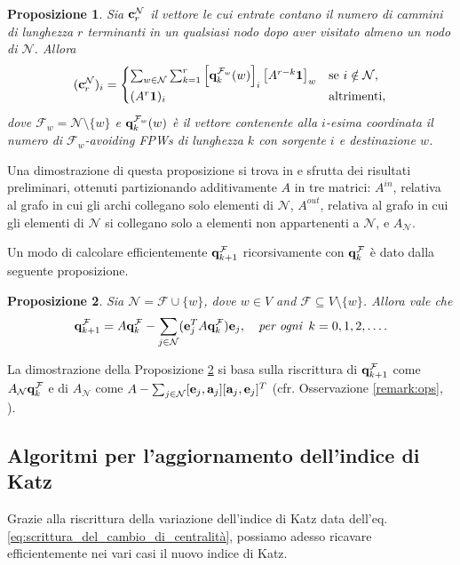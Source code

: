 \documentclass[a4paper]{article}
\newcommand{\evec}{{\bf e}}
\newcommand{\cvec}{{\bf c}}
\newcommand{\avec}{{\bf a}}
\newcommand{\qvec}{{\bf q}}
\newcommand{\bone}{\mathbf{1}}
\newcommand{\cN}{\mathcal{N}}
\newcommand{\cF}{\mathcal{F}}
\newcommand{\se}{\text{se }}
\newcommand{\altrimenti}{\text{altrimenti}}
\newtheorem{proposition}{Proposizione}
\begin{document}
	\begin{proposition} \label{prop:qkfi}
		Sia $\cvec_r^\cN$ il vettore le cui entrate contano il numero di
		cammini di lunghezza $r$ terminanti in un qualsiasi nodo dopo aver
		visitato almeno un nodo di $\cN$. Allora
		\[
			(\cvec_r^\cN)_i = \begin{cases}
			\sum_{w \in \cN} \sum_{k=1}^r \left[\qvec_k^{\cF_w}(w) \right]_i \left[A^{r-k} \bone\right]_w & \se i \notin \cN, \\
			(A^r \bone)_i & \altrimenti,
			\end{cases}
		\]
		dove $\cF_w = \cN \setminus \{ w \}$ e $\qvec_k^{\cF_w}(w)$ è
		il vettore contenente alla $i$-esima coordinata il numero di
		$\cF_w$-avoiding FPWs di lunghezza $k$ con sorgente $i$ e destinazione
		$w$.
	\end{proposition}
	
	Una dimostrazione di questa proposizione si trova in \cite[Proposition 4]{katz2024} e sfrutta dei risultati preliminari, ottenuti partizionando
	additivamente $A$ in tre matrici: $A^{in}$, relativa al grafo in cui gli
	archi collegano solo elementi di $\cN$, $A^{out}$, relativa al grafo in cui
	gli elementi di $\cN$ si collegano solo a elementi non appartenenti a $\cN$,
	e $A_{\cN}$.
	
	Un modo di calcolare efficientemente $\qvec_{k+1}^\cF$ ricorsivamente
	con $\qvec_k^\cF$ è dato dalla seguente proposizione.
	
	\begin{proposition} \label{prop:qveccf}
		Sia $\cN = \cF \cup \{w\}$, dove $w \in V$ and $\cF \subseteq V \setminus \{w\}$. Allora vale che
		\[
			\qvec_{k+1}^\cF = A \qvec_k^\cF - \sum_{j \in \cN} (\evec_j^T A \qvec_k^\cF) \evec_j, \quad \textit{per ogni }\,k = 0, 1, 2, \ldots.
		\]
	\end{proposition}
	
	La dimostrazione della Proposizione \ref{prop:qveccf} si basa sulla
	riscrittura di $\qvec_{k+1}^\cF$ come $A_\cN \qvec_k^\cF$ e di
	$A_\cN$ come $A - \sum_{j \in \cN} [\evec_j, \avec_j][\avec_j, \evec_j]^T$ (cfr. Osservazione \ref{remark:ops}, \cite[Proposition 5]{katz2024}).
	
	\subsection{Algoritmi per l'aggiornamento dell'indice di Katz}
	
	Grazie alla riscrittura della variazione dell'indice di Katz
	data dell'eq. \eqref{eq:scrittura_del_cambio_di_centralità}, possiamo
	adesso ricavare efficientemente nei vari casi il nuovo indice di Katz.
	
\end{document}
